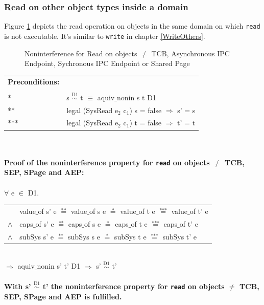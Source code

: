 \documentclass[11pt,a4paper,twoside]{article}
\begin{document}
{\subsubsection{Read on other object types inside a domain} 
Figure \ref{fig:ReadOthers} depicts the read operation on objects in the same domain on which \texttt{read} is not executable. It's similar to \texttt{write} in chapter \ref{WriteOthers}.
\begin{flushleft}
\begin{figure}[H]
\caption{Noninterference for Read on objects $\neq$ TCB, Asynchronous IPC Endpoint, Sychronous IPC Endpoint or Shared Page}
\label{fig:ReadOthers}
\end{figure}
\end{flushleft}
\begin{tabular}{ll}
\textbf{Preconditions:} \\ \\
* & s $\overset{\text{D1}}{\sim}$ t $\equiv$ aquiv$\_$nonin s t D1	\\ 
** & legal (SysRead e$_2$ c$_1$) s = false $\Rightarrow$ s' = s \\ 
*** & legal (SysRead e$_2$ c$_1$) t = false $\Rightarrow$ t' = t
\end{tabular} \\ \\ 
\textbf{Proof of the noninterference property for \texttt{read} on objects $\neq$ TCB, SEP, SPage and AEP:}\\ \\
$\forall$ e $\in$ D1. \\ 
\begin{tabular}{ll}
& value$\_$of s' e $\overset{\text{**}}{=}$ value$\_$of s e $\overset{\text{*}}{=}$ value$\_$of t e $\overset{\text{***}}{=}$ value$\_$of t' e \\
$\wedge$ & caps$\_$of s' e $\overset{\text{**}}{=}$ caps$\_$of s e $\overset{\text{*}}{=}$ caps$\_$of t e $\overset{\text{***}}{=}$ caps$\_$of t' e \\
$\wedge$ & subSys s' e $\overset{\text{**}}{=}$ subSys s e $\overset{\text{*}}{=}$ subSys t e $\overset{\text{***}}{=}$ subSys t' e
\end{tabular} \\
$\Rightarrow$ aquiv$\_$nonin s' t' D1 $\Rightarrow$ s' $\overset{\text{D1}}{\sim}$ t' \\ \\
\textbf{With s' $\overset{\text{D1}}{\sim}$ t' the noninterference property for \texttt{read} on objects $\neq$ TCB, SEP, SPage and AEP is fulfilled.}  
\clearpage
}
\end{document}
